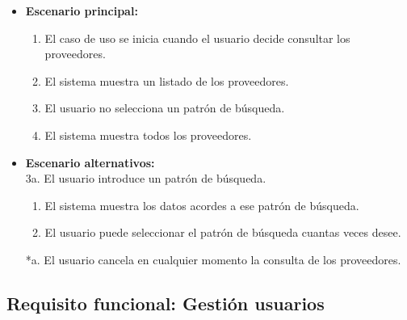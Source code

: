 \begin{itemize}\renewcommand{\labelitemi}{$\circ$}
 \item \textbf{Escenario principal:}
         \begin{enumerate}
          \item El caso de uso se inicia cuando el usuario decide consultar los proveedores.
          \item El sistema muestra un listado de los proveedores.
          \item El usuario no selecciona un patrón de búsqueda.
          \item El sistema muestra todos los proveedores.
         \end{enumerate}
  \item \textbf{Escenario alternativos:}\\
  			3a. El usuario introduce un patrón de búsqueda.
  			\begin{enumerate}
  			\item El sistema muestra los datos acordes a ese patrón de búsqueda.
  			\item El usuario puede seleccionar el patrón de búsqueda cuantas veces desee.
  			\end{enumerate}
          *a. El usuario cancela en cualquier momento la consulta de los proveedores.
\end{itemize}

\subsection{Requisito funcional: Gestión usuarios}

